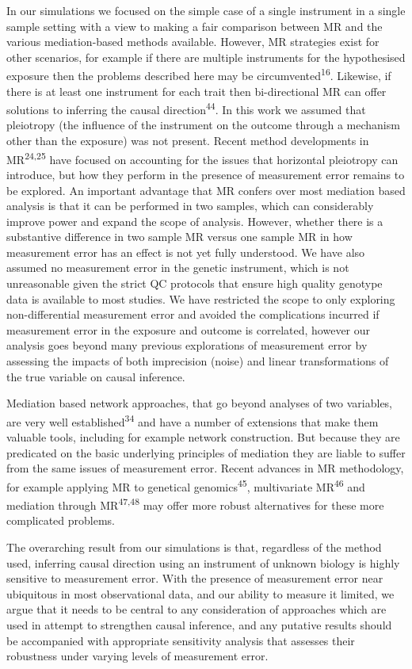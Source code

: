 \documentclass[]{article}
\begin{document}
In our simulations we focused on the simple case of a single instrument
in a single sample setting with a view to making a fair comparison
between MR and the various mediation-based methods available. However,
MR strategies exist for other scenarios, for example if there are
multiple instruments for the hypothesised exposure then the problems
described here may be circumvented\textsuperscript{16}. Likewise, if
there is at least one instrument for each trait then bi-directional MR
can offer solutions to inferring the causal
direction\textsuperscript{44}. In this work we assumed that pleiotropy
(the influence of the instrument on the outcome through a mechanism
other than the exposure) was not present. Recent method developments in
MR\textsuperscript{24,25} have focused on accounting for the issues that
horizontal pleiotropy can introduce, but how they perform in the
presence of measurement error remains to be explored. An important
advantage that MR confers over most mediation based analysis is that it
can be performed in two samples, which can considerably improve power
and expand the scope of analysis. However, whether there is a
substantive difference in two sample MR versus one sample MR in how
measurement error has an effect is not yet fully understood. We have
also assumed no measurement error in the genetic instrument, which is
not unreasonable given the strict QC protocols that ensure high quality
genotype data is available to most studies. We have restricted the scope
to only exploring non-differential measurement error and avoided the
complications incurred if measurement error in the exposure and outcome
is correlated, however our analysis goes beyond many previous
explorations of measurement error by assessing the impacts of both
imprecision (noise) and linear transformations of the true variable on
causal inference.

Mediation based network approaches, that go beyond analyses of two
variables, are very well established\textsuperscript{34} and have a
number of extensions that make them valuable tools, including for
example network construction. But because they are predicated on the
basic underlying principles of mediation they are liable to suffer from
the same issues of measurement error. Recent advances in MR methodology,
for example applying MR to genetical genomics\textsuperscript{45},
multivariate MR\textsuperscript{46} and mediation through
MR\textsuperscript{47,48} may offer more robust alternatives for these
more complicated problems.

The overarching result from our simulations is that, regardless of the
method used, inferring causal direction using an instrument of unknown
biology is highly sensitive to measurement error. With the presence of
measurement error near ubiquitous in most observational data, and our
ability to measure it limited, we argue that it needs to be central to
any consideration of approaches which are used in attempt to strengthen
causal inference, and any putative results should be accompanied with
appropriate sensitivity analysis that assesses their robustness under
varying levels of measurement error.
\end{document}
